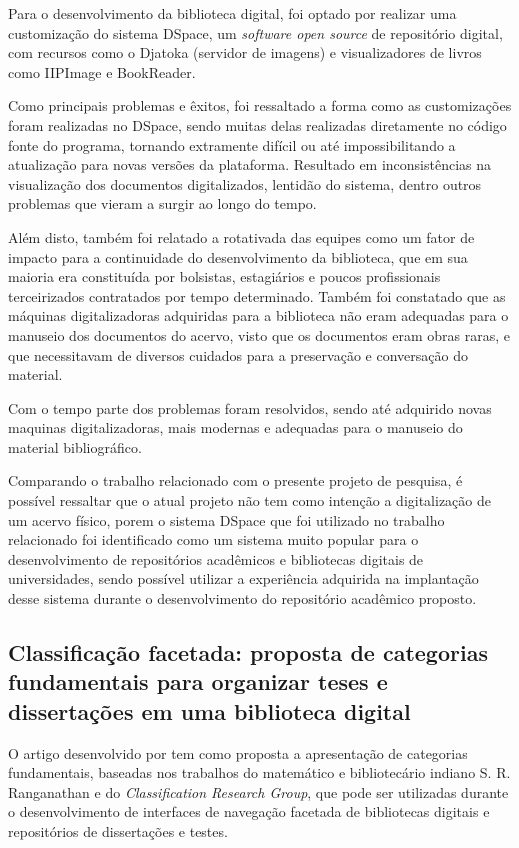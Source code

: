 Para o desenvolvimento da biblioteca digital, foi optado por realizar uma
customização do sistema DSpace, um \emph{software open source} de repositório
digital, com recursos como o Djatoka (servidor de imagens) e visualizadores
de livros como IIPImage e BookReader.

Como principais problemas e êxitos, foi ressaltado a forma como as customizações
foram realizadas no DSpace, sendo muitas delas realizadas diretamente no código fonte
do programa, tornando extramente difícil ou até impossibilitando a atualização
para novas versões da plataforma. Resultado em inconsistências na
visualização dos documentos digitalizados, lentidão do sistema, dentro outros
problemas que vieram a surgir ao longo do tempo.

Além disto, também foi relatado a rotativada das equipes como um fator de impacto
para a continuidade do desenvolvimento da biblioteca, que em sua
maioria era constituída por bolsistas, estagiários e poucos profissionais
terceirizados contratados por tempo determinado. Também foi constatado
que as máquinas digitalizadoras adquiridas para a biblioteca não eram
adequadas para o manuseio dos documentos do acervo, visto que os documentos
eram obras raras, e que necessitavam de diversos cuidados para a preservação
e conversação do material.

Com o tempo parte dos problemas foram resolvidos, sendo até adquirido novas
maquinas digitalizadoras, mais modernas e adequadas para o manuseio do material
bibliográfico.

Comparando o trabalho relacionado com o presente projeto de pesquisa,
é possível ressaltar que o atual projeto não tem como intenção a digitalização
de um acervo físico, porem o sistema DSpace que foi utilizado no trabalho
relacionado foi identificado como um sistema muito popular para o desenvolvimento
de repositórios acadêmicos e bibliotecas digitais de universidades, sendo
possível utilizar a experiência adquirida na implantação desse sistema durante
o desenvolvimento do repositório acadêmico proposto.

\subsection{Classificação facetada: proposta de categorias fundamentais para organizar teses e dissertações em uma biblioteca digital}

O artigo desenvolvido por \cite{PereiraClaytonMartins2021Cfpd} tem como
proposta a apresentação de categorias fundamentais, baseadas nos trabalhos
do matemático e bibliotecário indiano S. R. Ranganathan e do \emph{Classification Research Group}, que pode ser utilizadas
durante o desenvolvimento de interfaces de navegação facetada de bibliotecas
digitais e repositórios de dissertações e testes.

